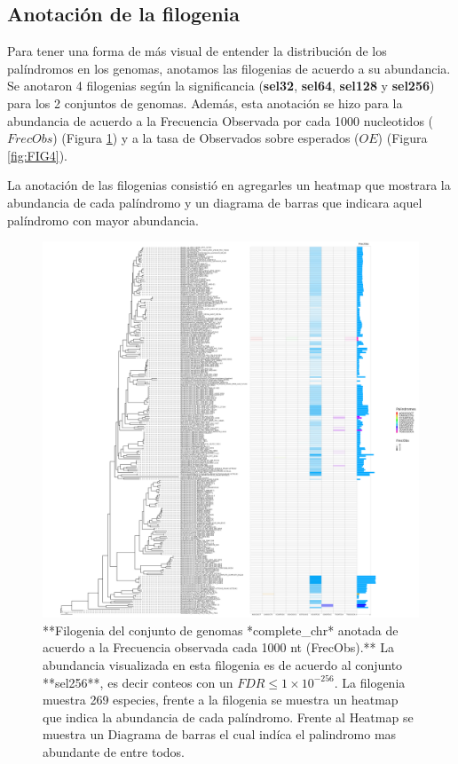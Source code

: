 \documentclass[
]{book}
\begin{document}
\hypertarget{anotaciuxf3n-de-la-filogenia}{%
\subsection{Anotación de la filogenia}\label{anotaciuxf3n-de-la-filogenia}}

Para tener una forma de más visual de entender la distribución de los palíndromos en los genomas, anotamos las filogenias de acuerdo a su abundancia. Se anotaron 4 filogenias según la significancia (\textbf{sel32}, \textbf{sel64}, \textbf{sel128} y \textbf{sel256}) para los 2 conjuntos de genomas. Además, esta anotación se hizo para la abundancia de acuerdo a la Frecuencia Observada por cada 1000 nucleotidos (\(FrecObs\)) (Figura \ref{fig:FIG3}) y a la tasa de Observados sobre esperados (\(OE\)) (Figura \ref{fig:FIG4}).

La anotación de las filogenias consistió en agregarles un heatmap que mostrara la abundancia de cada palíndromo y un diagrama de barras que indicara aquel palíndromo con mayor abundancia.

\begin{figure}

{\centering \includegraphics[width=75in]{figures/refseq_chr_269_Octanuc_FrecObs_sel256_filogenia_HIG} 

}

\caption{**Filogenia del conjunto de genomas *complete\_chr* anotada de acuerdo a la Frecuencia observada cada 1000 nt (FrecObs).** La abundancia visualizada en esta filogenia es de acuerdo al conjunto **sel256**, es decir conteos con un $FDR \leq 1 \times 10^{-256}$. La filogenia muestra 269 especies, frente a la filogenia se muestra un heatmap que indica la abundancia de cada palíndromo. Frente al Heatmap se muestra un Diagrama de barras el cual indíca el palindromo mas abundante de entre todos.}\label{fig:FIG3}
\end{figure}
\end{document}
